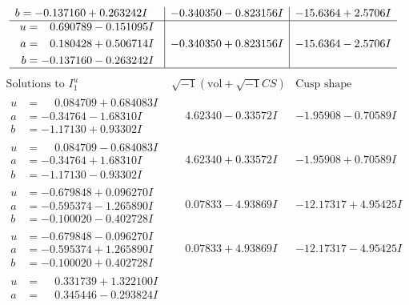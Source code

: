 \documentclass[1p]{elsarticle_modified}
\theoremstyle{definition}
\newcommand{\I}{\sqrt{-1}}
\begin{document}
$$\begin{array}{c|c|c}
\begin{aligned}
b &= -0.137160 + 0.263242 I\end{aligned}
 & -0.340350 - 0.823156 I & -15.6364 + 2.5706 I \\ \hline\begin{aligned}
u &= \phantom{-}0.690789 - 0.151095 I \\
a &= \phantom{-}0.180428 + 0.506714 I \\
b &= -0.137160 - 0.263242 I\end{aligned}
 & -0.340350 + 0.823156 I & -15.6364 - 2.5706 I\\
 \hline 
 \end{array}$$\newpage$$\begin{array}{c|c|c}  
\text{Solutions to }I^u_{1}& \I (\text{vol} + \sqrt{-1}CS) & \text{Cusp shape}\\
 \hline 
\begin{aligned}
u &= \phantom{-}0.084709 + 0.684083 I \\
a &= -0.34764 - 1.68310 I \\
b &= -1.17130 + 0.93302 I\end{aligned}
 & \phantom{-}4.62340 - 0.33572 I & -1.95908 - 0.70589 I \\ \hline\begin{aligned}
u &= \phantom{-}0.084709 - 0.684083 I \\
a &= -0.34764 + 1.68310 I \\
b &= -1.17130 - 0.93302 I\end{aligned}
 & \phantom{-}4.62340 + 0.33572 I & -1.95908 + 0.70589 I \\ \hline\begin{aligned}
u &= -0.679848 + 0.096270 I \\
a &= -0.595374 - 1.265890 I \\
b &= -0.100020 - 0.402728 I\end{aligned}
 & \phantom{-}0.07833 - 4.93869 I & -12.17317 + 4.95425 I \\ \hline\begin{aligned}
u &= -0.679848 - 0.096270 I \\
a &= -0.595374 + 1.265890 I \\
b &= -0.100020 + 0.402728 I\end{aligned}
 & \phantom{-}0.07833 + 4.93869 I & -12.17317 - 4.95425 I \\ \hline\begin{aligned}
u &= \phantom{-}0.331739 + 1.322100 I \\
a &= \phantom{-}0.345446 - 0.293824 I \\

\end{aligned}
\end{array}$$
\end{document}

